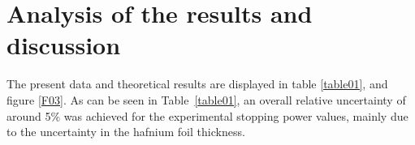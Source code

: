 \documentclass[aps,prb,reprint,groupedaddress]{revtex4-1}
\begin{document}
\section{Analysis of the results and discussion}
\label{discussion}

The present data and theoretical results are displayed in table \ref{table01}, and figure \ref{F03}. As can be seen in Table~\ref{table01}, an overall relative uncertainty of around 5$\%$ was achieved for the experimental stopping power values, mainly due to the uncertainty in the hafnium foil thickness. %
\end{document}
